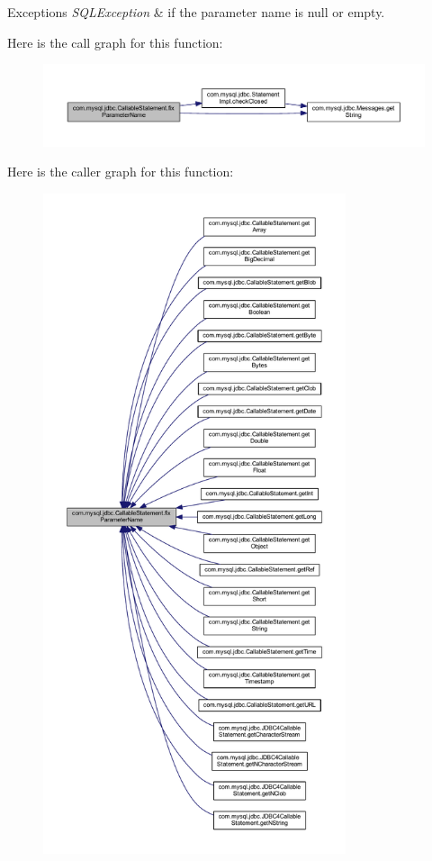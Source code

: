 \begin{DoxyExceptions}{Exceptions}
{\em S\+Q\+L\+Exception} & if the parameter name is null or empty. \\
\hline
\end{DoxyExceptions}
Here is the call graph for this function\+:\nopagebreak
\begin{figure}[H]
\begin{center}
\leavevmode
\includegraphics[width=350pt]{classcom_1_1mysql_1_1jdbc_1_1_callable_statement_a1986bfd17dcbabcad4efff9b897fab15_cgraph}
\end{center}
\end{figure}
Here is the caller graph for this function\+:\nopagebreak
\begin{figure}[H]
\begin{center}
\leavevmode
\includegraphics[height=550pt]{classcom_1_1mysql_1_1jdbc_1_1_callable_statement_a1986bfd17dcbabcad4efff9b897fab15_icgraph}
\end{center}
\end{figure}
